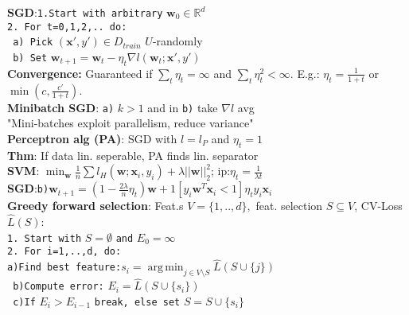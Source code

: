 \documentclass[11pt]{article}
\newcommand{\bv}[1]{\mathbf{#1}}
\newcommand{\R}{\mathbb{R}}
\DeclareMathOperator*{\argmin}{arg\,min}
\begin{document}
\begin{multicols}{4}
\textbf{SGD}:\verb|1.Start with arbitrary| $\bv{w}_0\in\R^d$\\
\verb|2. For t=0,1,2,.. do:|\\
\verb| a) Pick| $(\bv{x}',y')\in D_{train}$ $U$-randomly\\
\verb| b) Set| $\bv{w}_{t+1}=\bv{w}_t-\eta_t\nabla l(\bv{w}_t;\bv{x}',y')$\\
\textbf{Convergence:} Guaranteed if $\sum_t\eta_t=\infty$ and $\sum_t\eta_t^2<\infty.$ E.g.: $\eta_t=\frac{1}{1+t}$ or $\min(c,\frac{c'}{1+t}).$\\
\textbf{Minibatch SGD}: \verb|a)| $k>1$ and in \verb|b)| take $\nabla l$ avg\\
"Mini-batches exploit parallelism, reduce variance"\\
\textbf{Perceptron alg (PA)}: SGD with $l=l_P$ and $\eta_t=1$\\
\textbf{Thm}: If data lin. seperable, PA finds lin. separator\\
\textbf{SVM}: $\min_\bv{w}\frac{1}{n}\sum l_H(\bv{w};\bv{x}_i,y_i)+\lambda||\bv{w}||^2_2$; ip:$\eta_t=\frac{1}{\lambda t}$\\
\textbf{SGD}:\verb|b)|$\bv{w}_{t+1}=(1-\frac{2\lambda}{n}\eta_t)\bv{w}+1[y_i\bv{w}^T\bv{x}_i<1]\eta_t y_i\bv{x}_i$\\
\textbf{Greedy forward selection}: Feat.s $V=\{1,..,d\},$ feat. selection $S\subseteq V$, CV-Loss $\hat{L}(S)$:\\
\verb|1. Start with| $S=\emptyset$ \verb|and| $E_0=\infty$\\
\verb|2. For i=1,..,d, do:|\\
\verb|a)Find best feature:|$s_i=\argmin_{j\in V\setminus S}\hat{L}(S\cup\{j\})$\\
\verb| b)Compute error:| $E_i=\hat{L}(S\cup \{s_i\})$\\
\verb| c)If| $E_i>E_{i-1}$ \verb|break, else set| $S=S\cup\{s_i\}$


\end{multicols}
\end{document}
